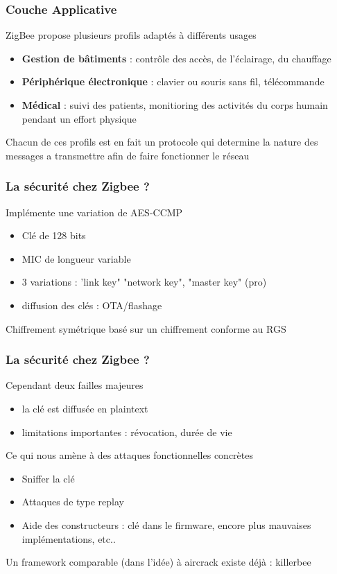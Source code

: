 \documentclass{beamer}
\begin{document}
  \begin{frame}
   \frametitle{Couche Applicative}
   \begin{block}{ZigBee propose plusieurs profils adaptés à différents usages}
     \begin{itemize}
      \item \textbf{Gestion de bâtiments} : contrôle des accès, de l'éclairage, du chauffage
      \item \textbf{Périphérique électronique} : clavier ou souris sans fil, télécommande
      \item \textbf{Médical} : suivi des patients, monitioring des activités du corps humain pendant un effort physique
     \end{itemize}
     
     Chacun de ces profils est en fait un protocole qui determine la nature des messages a transmettre afin de faire fonctionner le réseau

   \end{block}

  \end{frame}
  
  \begin{frame}
  \frametitle{La sécurité chez Zigbee ?}
  \begin{block}{Implémente une variation de AES-CCMP}
    \begin{itemize}
	\item Clé de 128 bits
	\item MIC de longueur variable
	\item 3 variations : 'link key" "network key", "master key" (pro)
	\item diffusion des clés : OTA/flashage
    \end{itemize}
  Chiffrement symétrique basé sur un chiffrement conforme au RGS
  \end{block}
  \end{frame}

  \begin{frame}
  \frametitle{La sécurité chez Zigbee ?}
  \begin{block}{Cependant deux failles majeures}
    \begin{itemize}
	\item la clé est diffusée en plaintext
	\item limitations importantes : révocation, durée de vie
    \end{itemize}
  \end{block}
  \begin{block}{Ce qui nous amène à des attaques fonctionnelles concrètes}
  \begin{itemize}
      \item Sniffer la  clé
      \item Attaques de type replay
      \item Aide des constructeurs : clé dans le firmware, encore plus mauvaises implémentations, etc..
  \end{itemize}
  Un framework comparable (dans l'idée) à aircrack existe déjà : killerbee
  \end{block}
  \end{frame}
\end{document}
